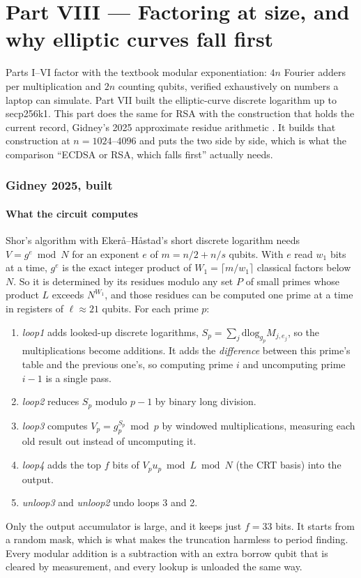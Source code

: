 \clearpage
\part*{Part VIII --- Factoring at size, and why elliptic curves fall first}

Parts I--VI factor with the textbook modular exponentiation: $4n$ Fourier adders per
multiplication and $2n$ counting qubits, verified exhaustively on numbers a laptop can simulate.
Part VII built the elliptic-curve discrete logarithm up to secp256k1. This part does the same for
RSA with the construction that holds the current record, Gidney's 2025 approximate residue
arithmetic \cite{ec:gidney25rsa}. It builds that construction at $n=1024$--$4096$ and puts the two
side by side, which is what the comparison ``ECDSA or RSA, which falls first'' actually needs.

\section{Gidney 2025, built}\label{rsa:sec:g25}

\subsection{What the circuit computes}

Shor's algorithm with Eker\aa{}--H\aa{}stad's short discrete logarithm needs $V=g^e\bmod N$ for an
exponent $e$ of $m=n/2+n/s$ qubits. With $e$ read $w_1$ bits at a time, $g^e$ is the exact integer
product of $W_1=\lceil m/w_1\rceil$ classical factors below $N$. So it is determined by its residues
modulo any set $P$ of small primes whose product $L$ exceeds $N^{W_1}$, and those residues can be
computed one prime at a time in registers of $\ell\approx21$ qubits. For each prime $p$:
\begin{enumerate}\setlength\itemsep{1pt}
\item \emph{loop1} adds looked-up discrete logarithms, $S_p=\sum_j\mathrm{dlog}_{g_p}M_{j,e_j}$, so the
multiplications become additions. It adds the \emph{difference} between this prime's table and the
previous one's, so computing prime $i$ and uncomputing prime $i-1$ is a single pass.
\item \emph{loop2} reduces $S_p$ modulo $p-1$ by binary long division.
\item \emph{loop3} computes $V_p=g_p^{S_p}\bmod p$ by windowed multiplications, measuring each
old result out instead of uncomputing it.
\item \emph{loop4} adds the top $f$ bits of $V_p u_p\bmod L\bmod N$ (the CRT basis) into the output.
\item \emph{unloop3} and \emph{unloop2} undo loops 3 and 2.
\end{enumerate}
Only the output accumulator is large, and it keeps just $f=33$ bits. It starts from a random mask,
which is what makes the truncation harmless to period finding. Every modular addition is a
subtraction with an extra borrow qubit that is cleared by measurement, and every lookup is
unloaded the same way.

